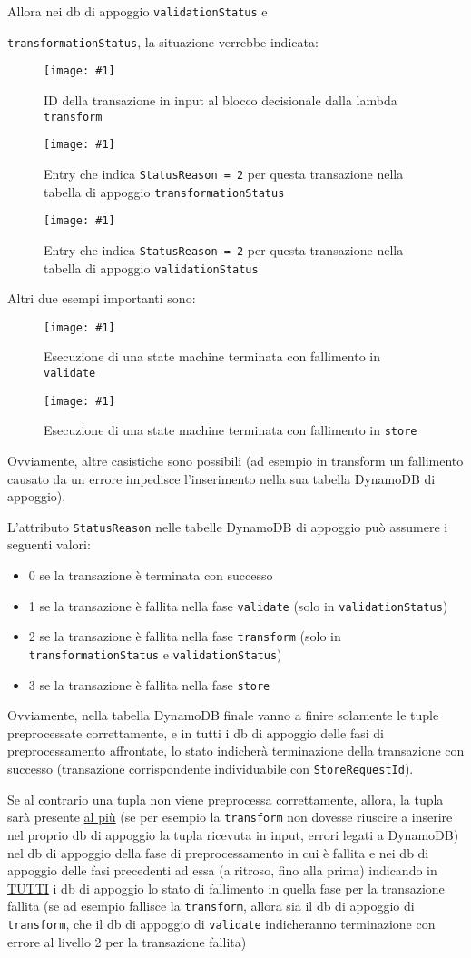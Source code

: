 \documentclass[
    sigconf, 
    screen=false, 
    acmthm=false, 
    nonacm
]{acmart}
\def\maxpicwidth{8.15cm}
\newcommand{\pichere}[3] {
\begin{figure}[H]
\centering
\texttt{[image: \#1]}
\caption{#3}
\end{figure}
}
\begin{document}
Allora nei db di appoggio \texttt{validationStatus} e 

\texttt{transformationStatus}, la situazione verrebbe indicata:

\pichere{case-transform/transactionid}{5cm}{ID della transazione in input al blocco decisionale dalla lambda \texttt{transform}}

\pichere{case-transform/transformationstatus}{2cm}{Entry che indica \texttt{StatusReason = 2} per questa transazione nella tabella di appoggio \texttt{transformationStatus}}

\pichere{case-transform/validationstatus}{1cm}{Entry che indica \texttt{StatusReason = 2} per questa transazione nella tabella di appoggio \texttt{validationStatus}}

Altri due esempi importanti sono:

\pichere{case-validate/sfn}{5cm}{Esecuzione di una state machine terminata con fallimento in \texttt{validate}}

\pichere{case-store/sfn}{5cm}{Esecuzione di una state machine terminata con fallimento in \texttt{store}}

Ovviamente, altre casistiche sono possibili (ad esempio in transform un fallimento causato da un errore
impedisce l'inserimento nella sua tabella DynamoDB di appoggio).

L'attributo \texttt{StatusReason} nelle tabelle DynamoDB di appoggio può assumere i seguenti valori:

\begin{itemize}
    \item 0 se la transazione è terminata con successo
    \item 1 se la transazione è fallita nella fase \texttt{validate} (solo in \texttt{validationStatus})
    \item 2 se la transazione è fallita nella fase \texttt{transform} (solo in \texttt{transformationStatus} e \texttt{validationStatus})
    \item 3 se la transazione è fallita nella fase \texttt{store}
\end{itemize}

Ovviamente, nella tabella DynamoDB finale vanno a finire solamente le tuple preprocessate correttamente, e
in tutti i db di appoggio delle fasi di preprocessamento affrontate, lo stato indicherà terminazione della 
transazione con successo (transazione corrispondente individuabile con \texttt{StoreRequestId}).

Se al contrario una tupla non viene preprocessa correttamente, allora, la tupla sarà presente \underline{al più} 
(se per esempio la \texttt{transform} non dovesse riuscire a inserire nel proprio db di appoggio la tupla ricevuta in input, 
errori legati a DynamoDB)
nel db di appoggio della fase di preprocessamento in cui è fallita e nei db di appoggio delle fasi precedenti ad 
essa (a ritroso, fino alla prima) indicando in \underline{TUTTI} i db di appoggio lo stato di fallimento in quella fase per la transazione fallita (se ad 
esempio fallisce la \texttt{transform}, allora sia il db di appoggio di \texttt{transform}, che il db di appoggio di \texttt{validate} 
indicheranno terminazione con errore al livello 2 per la transazione fallita)
\end{document}
